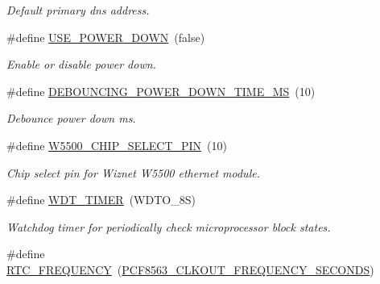\begin{DoxyCompactItemize}
\begin{DoxyCompactList}\small\item\em Default primary dns address. \end{DoxyCompactList}\item 
\mbox{\label{rmap-config_8h_a9ace81994cbeb6153f9dd5adf0e6dbee}} 
\#define \hyperlink{rmap-config_8h_a9ace81994cbeb6153f9dd5adf0e6dbee}{U\+S\+E\+\_\+\+P\+O\+W\+E\+R\+\_\+\+D\+O\+WN}~(false)
\begin{DoxyCompactList}\small\item\em Enable or disable power down. \end{DoxyCompactList}\item 
\mbox{\label{rmap-config_8h_a7b9497e328b8f872cd7677cfd02bbf65}} 
\#define \hyperlink{rmap-config_8h_a7b9497e328b8f872cd7677cfd02bbf65}{D\+E\+B\+O\+U\+N\+C\+I\+N\+G\+\_\+\+P\+O\+W\+E\+R\+\_\+\+D\+O\+W\+N\+\_\+\+T\+I\+M\+E\+\_\+\+MS}~(10)
\begin{DoxyCompactList}\small\item\em Debounce power down ms. \end{DoxyCompactList}\item 
\mbox{\label{rmap-config_8h_a487cf0916151ca6772bc10ad17de96f8}} 
\#define \hyperlink{rmap-config_8h_a487cf0916151ca6772bc10ad17de96f8}{W5500\+\_\+\+C\+H\+I\+P\+\_\+\+S\+E\+L\+E\+C\+T\+\_\+\+P\+IN}~(10)
\begin{DoxyCompactList}\small\item\em Chip select pin for Wiznet W5500 ethernet module. \end{DoxyCompactList}\item 
\#define \hyperlink{rmap-config_8h_a983c9777673ee873f12ec9f489215321}{W\+D\+T\+\_\+\+T\+I\+M\+ER}~(W\+D\+T\+O\+\_\+8S)
\begin{DoxyCompactList}\small\item\em Watchdog timer for periodically check microprocessor block states. \end{DoxyCompactList}\item 
\mbox{\label{rmap-config_8h_a6b7af814754ac70e8aa5e34aa9295df5}} 
\#define \hyperlink{rmap-config_8h_a6b7af814754ac70e8aa5e34aa9295df5}{R\+T\+C\+\_\+\+F\+R\+E\+Q\+U\+E\+N\+CY}~(\hyperlink{pcf8563_8h_a3a76b38037d3ee5e0231c402a0f7f352}{P\+C\+F8563\+\_\+\+C\+L\+K\+O\+U\+T\+\_\+\+F\+R\+E\+Q\+U\+E\+N\+C\+Y\+\_\+\+S\+E\+C\+O\+N\+DS})

\end{DoxyCompactItemize}
